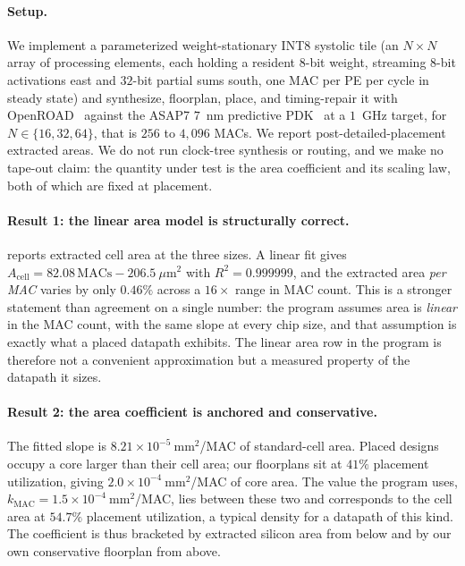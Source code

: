 \paragraph{Setup.}
We implement a parameterized weight-stationary INT8 systolic tile (an $N \times N$ array of processing elements, each holding a resident $8$-bit weight, streaming $8$-bit activations east and $32$-bit partial sums south, one MAC per PE per cycle in steady state) and synthesize, floorplan, place, and timing-repair it with OpenROAD~\citep{ajayi2019openroad} against the ASAP7 $7$~nm predictive PDK~\citep{clark2016asap7} at a $1$~GHz target, for $N \in \{16, 32, 64\}$, that is $256$ to $4{,}096$ MACs.
We report post-detailed-placement extracted areas.
We do not run clock-tree synthesis or routing, and we make no tape-out claim: the quantity under test is the area coefficient and its scaling law, both of which are fixed at placement.

\paragraph{Result 1: the linear area model is structurally correct.}
 reports extracted cell area at the three sizes.
A linear fit gives $A_{\mathrm{cell}} = 82.08\,\mathrm{MACs} - 206.5\ \mu\mathrm{m}^2$ with $R^2 = 0.999999$, and the extracted area \emph{per MAC} varies by only $0.46\%$ across a $16\times$ range in MAC count.
This is a stronger statement than agreement on a single number: the program assumes area is \emph{linear} in the MAC count, with the same slope at every chip size, and that assumption is exactly what a placed datapath exhibits.
The linear area row in the program is therefore not a convenient approximation but a measured property of the datapath it sizes.

\paragraph{Result 2: the area coefficient is anchored and conservative.}
The fitted slope is $8.21 \times 10^{-5}\ \mathrm{mm}^2$/MAC of standard-cell area.
Placed designs occupy a core larger than their cell area; our floorplans sit at $41\%$ placement utilization, giving $2.0 \times 10^{-4}\ \mathrm{mm}^2$/MAC of core area.
The value the program uses, $k_{\mathrm{MAC}} = 1.5 \times 10^{-4}\ \mathrm{mm}^2$/MAC, lies between these two and corresponds to the cell area at $54.7\%$ placement utilization, a typical density for a datapath of this kind.
The coefficient is thus bracketed by extracted silicon area from below and by our own conservative floorplan from above.

